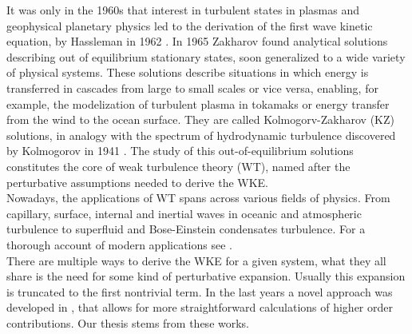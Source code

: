     It was only in the 1960s that interest in turbulent states in plasmas and geophysical planetary physics led to the derivation of the first wave kinetic equation, by Hassleman in 1962 \cite{Hasselmann1962}. In 1965 Zakharov \cite{Zakharov1965} found analytical solutions describing out of equilibrium stationary states, soon generalized to a wide variety of physical systems. These solutions describe situations in which energy is transferred in cascades from large to small scales or vice versa, enabling, for example, the modelization of  turbulent plasma in tokamaks or energy transfer from the wind to the ocean surface. They are called Kolmogorv-Zakharov (KZ) solutions, in analogy with the spectrum of hydrodynamic turbulence discovered by Kolmogorov in 1941 \cite{1991}. The study of this out-of-equilibrium solutions constitutes the core of weak turbulence theory (WT), named after the perturbative assumptions needed to derive the WKE. \\ 
    Nowadays, the applications of WT spans across various fields of physics. From capillary, surface, internal and inertial waves in oceanic and atmospheric turbulence to superfluid and Bose-Einstein condensates turbulence. For a thorough account of modern applications see \cite{Nazarenko2011}.\\ 
    There are multiple ways to derive the WKE for a given system, what they all share is the need for some kind of perturbative expansion. Usually this expansion is truncated to the first nontrivial term. In the last years a novel approach was developed in \cite{Rosenhaus:2022uwa} \cite{Rosenhaus:2023pdj} \cite{Rosenhaus:2023sik} \cite{Rosenhaus2023}, that allows for more straightforward calculations of higher order contributions. Our thesis stems from these works. \\


